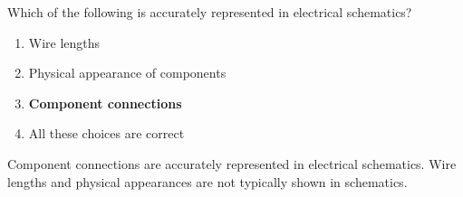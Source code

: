 \begin{tcolorbox}[colback=gray!10!white,colframe=black!75!black,title={T6C12}]
    Which of the following is accurately represented in electrical schematics?
    \begin{enumerate}[label=\Alph*),noitemsep]
        \item Wire lengths
        \item Physical appearance of components
        \item \textbf{Component connections}
        \item All these choices are correct
    \end{enumerate}
\end{tcolorbox}
Component connections are accurately represented in electrical schematics. Wire lengths and physical appearances are not typically shown in schematics.
